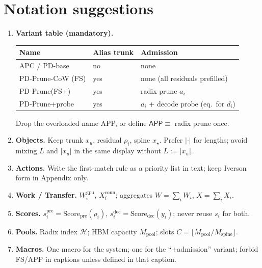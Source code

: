 \documentclass[11pt]{article}
\newcommand{\sys}{\textsf{PD-Prune}\xspace}
\newcommand{\Work}{W}
\newcommand{\Xfer}{X}
\begin{document}
\section{Notation suggestions}
\begin{enumerate}
  \item \textbf{Variant table (mandatory).}
  \begin{center}
  \small
  \begin{tabular}{@{}lll@{}}
  \toprule
  Name & Alias trunk & Admission \\
  \midrule
  APC / PD-base & no & none \\
  \sys-CoW (FS) & yes & none (all residuals prefilled) \\
  \sys (FS+) & yes & radix prune $a_i$ \\
  \sys+probe & yes & $a_i$ + decode probe (eq.\ for $d_i$) \\
  \bottomrule
  \end{tabular}
  \end{center}
  Drop the overloaded name \textsf{APP}, or define
  $\mathsf{APP}\equiv$ radix prune once.

  \item \textbf{Objects.} Keep trunk $x_u$, residual $\rho_i$, spine $x_\star$.
        Prefer $|\cdot|$ for lengths; avoid mixing $L$ and $|x_u|$ in the same
        display without $L:=|x_u|$.

  \item \textbf{Actions.} Write the first-match rule as a priority list in
        text; keep Iverson form in Appendix only.

  \item \textbf{Work / Transfer.}
        $\Work_i^{\mathrm{gpu}}$, $\Xfer_i^{\mathrm{conn}}$;
        aggregates $\Work=\sum_i\Work_i$, $\Xfer=\sum_i\Xfer_i$.

  \item \textbf{Scores.}
        $s_i^{\mathrm{pre}}=\mathrm{Score}_{\mathrm{pre}}(\rho_i)$,
        $s_i^{\mathrm{dec}}=\mathrm{Score}_{\mathrm{dec}}(y_i)$;
        never reuse $s_i$ for both.

  \item \textbf{Pools.}
        Radix index $\mathcal{H}$; HBM capacity $M_{\mathrm{pool}}$;
        slots $C=\lfloor M_{\mathrm{pool}}/M_{\mathrm{spine}}\rfloor$.

  \item \textbf{Macros.}
        One macro for the system; one for the ``+admission'' variant;
        forbid FS/APP in captions unless defined in that caption.
\end{enumerate}
\end{document}
